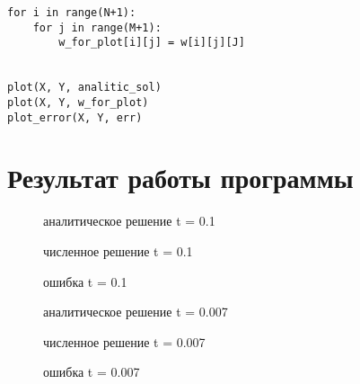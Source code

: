 \documentclass{article}
\begin{document}
\begin{verbatim}
for i in range(N+1):
    for j in range(M+1):
        w_for_plot[i][j] = w[i][j][J]


plot(X, Y, analitic_sol)
plot(X, Y, w_for_plot)
plot_error(X, Y, err)
\end{verbatim}
\newpage
\section{Результат работы программы}
\begin{figure}[h]
\caption{аналитическое решение t = 0.1}
\label{ris:image}
\end{figure}
\begin{figure}[h]
\caption{численное решение t = 0.1}
\label{ris:image}
\end{figure}

\begin{figure}[h]
\caption{ошибка  t = 0.1}
\label{ris:image}
\end{figure}

\begin{figure}[h]
\caption{аналитическое решение t = 0.007}
\label{ris:image}
\end{figure}
\begin{figure}[h]
\caption{численное решение t = 0.007}
\label{ris:image}
\end{figure}

\begin{figure}[h]
\caption{ошибка  t = 0.007}
\label{ris:image}
\end{figure}
\end{document}
